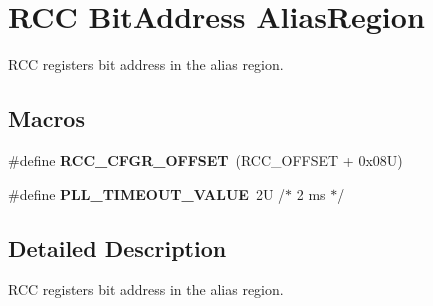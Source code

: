 \hypertarget{group___r_c_c_ex___bit_address___alias_region}{}\section{R\+CC Bit\+Address Alias\+Region}
\label{group___r_c_c_ex___bit_address___alias_region}


R\+CC registers bit address in the alias region.  


\subsection*{Macros}
\begin{DoxyCompactItemize}
\item 
\mbox{\label{group___r_c_c_ex___bit_address___alias_region_gafb1e90a88869585b970749de3c16ce4a}} 
\#define {\bfseries R\+C\+C\+\_\+\+C\+F\+G\+R\+\_\+\+O\+F\+F\+S\+ET}~(R\+C\+C\+\_\+\+O\+F\+F\+S\+ET + 0x08\+U)
\item 
\mbox{\label{group___r_c_c_ex___bit_address___alias_region_gad54d8ad9b3511329efee38b3ad0665de}} 
\#define {\bfseries P\+L\+L\+\_\+\+T\+I\+M\+E\+O\+U\+T\+\_\+\+V\+A\+L\+UE}~2\+U  /$\ast$ 2 ms $\ast$/
\end{DoxyCompactItemize}


\subsection{Detailed Description}
R\+CC registers bit address in the alias region. 

